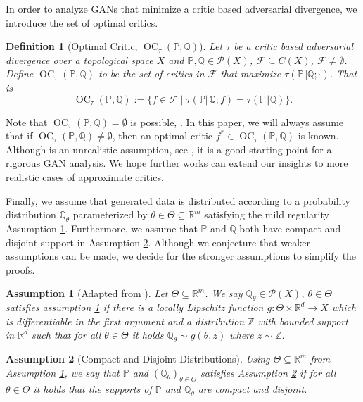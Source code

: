 \documentclass{article}
\DeclareMathOperator{\oc}{OC}
\newtheorem{definition}{Definition}
\newtheorem{assumption}{Assumption}
\begin{document}
In order to analyze GANs that minimize a critic based adversarial divergence, we introduce the set of optimal critics.
\begin{definition}[Optimal Critic,\; $\oc_{\tau}(\mathbb P,\mathbb Q)$]\label{D:opt_critic}
Let $\tau$ be a critic based adversarial divergence over a topological space $X$ and
$\mathbb P,\mathbb Q\in\mathcal P(X)$, $\mathcal F\subseteq C(X)$, $\mathcal F\neq\emptyset$.
 Define $\oc_{\tau}(\mathbb P,\mathbb Q)$ to be the set of critics in $\mathcal F$ that maximize $\tau(\mathbb P\Vert\mathbb Q;\cdot)$.
 That is
\[\oc_{\tau}(\mathbb P,\mathbb Q):=\{f\in\mathcal F\mid \tau(\mathbb P\Vert\mathbb Q;f)=\tau(\mathbb P\Vert\mathbb Q)\}.\]
\end{definition}
Note that $\oc_{\tau}(\mathbb P,\mathbb Q)=\emptyset$ is possible, \cite{arjovsky2017towards}. 
In this paper, we will always assume that if $\oc_{\tau}(\mathbb P,\mathbb Q)\not =\emptyset$, 
then an optimal critic $f^*\in\oc_{\tau}(\mathbb P,\mathbb Q)$ is known. Although is an unrealistic assumption,
see \cite{binkowski2018demystifying}, it is a good starting point for a rigorous GAN analysis.
We hope further works can extend our insights to more realistic cases of approximate critics.



Finally, we assume that generated data is distributed according to a probability distribution $\mathbb Q_\theta$
parameterized by $\theta\in\Theta\subseteq\mathbb R^m$ satisfying the mild regularity Assumption \ref{A:1}. Furthermore, we assume that $\mathbb P$ and $\mathbb Q$ both have
compact and disjoint support in Assumption \ref{A:2}. Although we conjecture that weaker assumptions can be made, we decide for the stronger assumptions
to simplify the proofs.

\begin{assumption}[Adapted from \cite{arjovsky2017wasserstein}]\label{A:1}
 Let $\Theta\subseteq\mathbb R^m$. We say $\mathbb Q_\theta\in\mathcal P(X)$, $\theta\in\Theta$
 satisfies assumption \ref{A:1} if there is a locally Lipschitz function $g:\Theta\times\mathbb R^d\to X$
 which is differentiable in the first argument
 and a distribution $\mathbb Z$ with bounded support in $\mathbb R^d$ such that
 for all $\theta\in\Theta$ it holds $\mathbb Q_\theta\sim g(\theta,z)$
 where $z\sim\mathbb Z$.
\end{assumption}

\begin{assumption}[Compact and Disjoint Distributions]\label{A:2}
 Using $\Theta\subseteq\mathbb R^m$ from Assumption \ref{A:1}, we say that $\mathbb P$ and $(\mathbb Q_\theta)_{\theta\in\Theta}$
 satisfies Assumption \ref{A:2} if for all
 $\theta\in\Theta$ it holds that the supports of
 $\mathbb P$ and $\mathbb Q_\theta$ are compact and disjoint.
\end{assumption}
\end{document}
